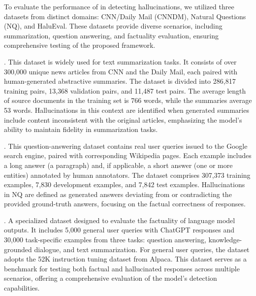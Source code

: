 To evaluate the performance of \sysname in detecting hallucinations, we utilized three datasets from distinct domains: CNN/Daily Mail (CNNDM), Natural Questions (NQ), and HaluEval. These datasets provide diverse scenarios, including summarization, question answering, and factuality evaluation, ensuring comprehensive testing of the proposed framework.

 \cite{hermann2015teaching}. This dataset is widely used for text summarization tasks. It consists of over 300,000 unique news articles from CNN and the Daily Mail, each paired with human-generated abstractive summaries. The dataset is divided into 286,817 training pairs, 13,368 validation pairs, and 11,487 test pairs. The average length of source documents in the training set is 766 words, while the summaries average 53 words. Hallucinations in this context are identified when generated summaries include content inconsistent with the original articles, emphasizing the model's ability to maintain fidelity in summarization tasks.

 \cite{kwiatkowski2019natural}. This question-answering dataset contains real user queries issued to the Google search engine, paired with corresponding Wikipedia pages. Each example includes a long answer (a paragraph) and, if applicable, a short answer (one or more entities) annotated by human annotators. The dataset comprises 307,373 training examples, 7,830 development examples, and 7,842 test examples. Hallucinations in NQ are defined as generated answers deviating from or contradicting the provided ground-truth answers, focusing on the factual correctness of responses.

 \cite{li2023halueval}. A specialized dataset designed to evaluate the factuality of language model outputs. It includes 5,000 general user queries with ChatGPT responses and 30,000 task-specific examples from three tasks: question answering, knowledge-grounded dialogue, and text summarization. For general user queries, the dataset adopts the 52K instruction tuning dataset from Alpaca. This dataset serves as a benchmark for testing both factual and hallucinated responses across multiple scenarios, offering a comprehensive evaluation of the model's detection capabilities.


